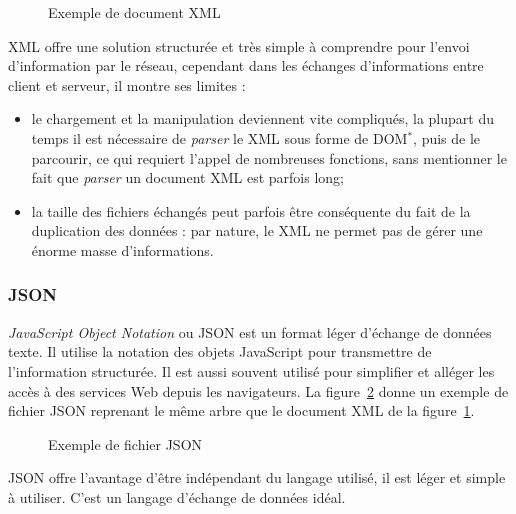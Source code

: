\vspace{0.20cm}

\begin{figure}[!ht]
	
	\caption{Exemple de document XML}
	\label{code:exempleXML}

\end{figure}

XML offre une solution structur\'ee et tr\`es simple \`a comprendre pour l'envoi d'information par le r\'eseau, cependant dans les \'echanges d'informations entre client et serveur, il montre ses limites :

\begin{itemize}
	\item le chargement et la manipulation deviennent vite compliqu\'es, la plupart du temps il est n\'ecessaire de \textit{parser} le XML sous forme de DOM$^*$, puis de le parcourir, ce qui requiert l'appel de nombreuses fonctions, sans mentionner le fait que \textit{parser} un document XML est parfois long;
	\item la taille des fichiers \'echang\'es peut parfois \^etre cons\'equente du fait de la duplication des donn\'ees : par nature, le XML ne permet pas de g\'erer une \'enorme masse d'informations.

\end{itemize}

\subsubsection{JSON}

\textit{JavaScript Object Notation} ou JSON est un format l\'eger d'\'echange de donn\'ees texte.
Il utilise la notation des objets JavaScript pour transmettre de l'information structur\'ee.
Il est aussi souvent utilis\'e pour simplifier et all\'eger les acc\`es \`a des services Web depuis les navigateurs.
La figure~\ref{code:exempleJSON} donne un exemple de fichier JSON reprenant le m\^eme arbre que le document XML de la figure~\ref{code:exempleXML}.

\clearpage

\begin{figure}[!ht]
	
	\caption{Exemple de fichier JSON}
	\label{code:exempleJSON}

\end{figure}

JSON offre l'avantage d'\^etre ind\'ependant du langage utilis\'e, il est l\'eger et simple \`a utiliser.
C'est un langage d'\'echange de donn\'ees id\'eal.

